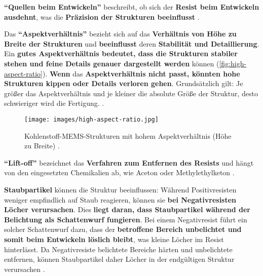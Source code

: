 \documentclass{article} %
\begin{document}
\textbf{``Quellen beim Entwickeln''} beschreibt, ob sich der \textbf{Resist beim Entwickeln ausdehnt}, was die \textbf{Präzision der Strukturen beeinflusst} \cite{hoegel2024}. 

\vspace{1em}

Das \textbf{``Aspektverhältnis''} bezieht sich auf das \textbf{Verhältnis von Höhe zu Breite der Strukturen} und \textbf{beeinflusst} deren \textbf{Stabilität und Detaillierung}. Ein \textbf{gutes Aspektverhältnis bedeutet, dass die Strukturen stabiler stehen und feine Details genauer dargestellt werden} können (\autoref{fig:high-aspect-ratio}). \textbf{Wenn} das \textbf{Aspektverhältnis nicht passt, könnten hohe Strukturen kippen oder Details verloren gehen}. Grundsätzlich gilt: Je größer das Aspektverhältnis und je kleiner die absolute Größe der Struktur, desto schwieriger wird die Fertigung. \cite{madou2002, wolf2000, gerald2006, wikipedia_aspektverhaeltnis}. 

\begin{figure}[htb!]
    \centering
    \texttt{[image: images/high-aspect-ratio.jpg]} %
    \captionsetup{labelfont=bf, width=.85\textwidth} %
    \caption{Kohlenstoff-MEMS-Strukturen mit hohem Aspektverhältnis (Höhe zu Breite) \cite{carbonMEMS}.}
    \label{fig:high-aspect-ratio}
\end{figure}

\vspace{1em}


\textbf{``Lift-off''} bezeichnet das \textbf{Verfahren zum Entfernen des Resists} und hängt von den eingesetzten Chemikalien ab, wie Aceton oder Methylethylketon \cite{wolf2000, rogers2008}. 

\vspace{1em}

\textbf{Staubpartikel} können die Struktur beeinflussen: Während Positivresisten weniger empfindlich auf Staub reagieren, können sie \textbf{bei Negativresisten Löcher verursachen}. Dies \textbf{liegt daran, dass Staubpartikel während der Belichtung als Schattenwurf fungieren}. Bei einem Negativresist führt ein solcher Schattenwurf dazu, dass der \textbf{betroffene Bereich unbelichtet und somit beim Entwickeln löslich bleibt}, was kleine Löcher im Resist hinterlässt. Da Negativresiste belichtete Bereiche härten und unbelichtete entfernen, können Staubpartikel daher Löcher in der endgültigen Struktur verursachen \cite{madou2002, sciencedirect_photoresist}.
\end{document}
